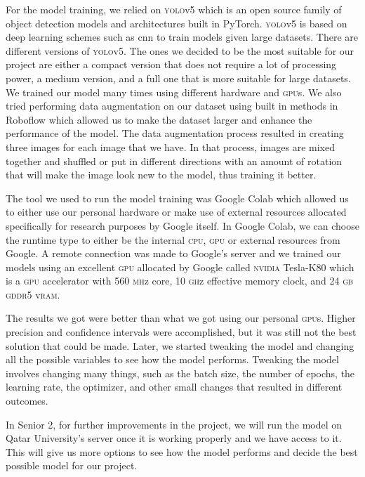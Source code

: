 \documentclass[../main.tex]{subfiles}
\begin{document}
For the model training, we relied on \textsc{yolo}v5 which is an open
source family of object detection models and architectures built in 
PyTorch. \textsc{yolo}v5 is based on deep learning schemes such as 
\gls{cnn} to train models given large datasets. There are different
versions of \textsc{yolo}v5. The ones we decided to be 
the most suitable for our project are either 
a compact version that does not require a lot of processing 
power, a medium version, and a full one that
is more suitable for large datasets. We trained our model many times 
using different hardware and \textsc{gpu}s. We also tried performing 
data augmentation on our dataset using built in methods in Roboflow 
which allowed us to make the dataset larger and enhance the performance 
of the model. The data augmentation process resulted in creating three 
images for each image that we have. In that process, images are mixed
together and shuffled or put in different directions with an amount of
rotation that will make the image look new to the model, 
thus training it better.

The tool we used to run the model training was Google 
Colab which allowed us to either use our personal hardware or 
make use of external resources allocated specifically for research 
purposes by Google itself. In Google Colab, we can choose the runtime 
type to either be the internal \textsc{cpu}, \textsc{gpu} or external 
resources from Google. A remote connection was made to Google's server 
and we trained our models using an excellent \textsc{gpu} 
allocated by Google called \textsc{nvidia} Tesla-K80 which is a \textsc{gpu} 
accelerator with 560 \textsc{mh}z core, 10 \textsc{gh}z effective memory clock, and 24 \textsc{gb} 
\textsc{gddr5} v\textsc{ram}.

The results we got were better than what we got using our personal 
\textsc{gpu}s. Higher precision and confidence intervals were 
accomplished, but it was still not the best solution that could be made. 
Later, we started tweaking the model and changing all the possible 
variables to see how the model performs. Tweaking the model involves 
changing many things, such as the batch size, the number of epochs, the 
learning rate, the optimizer, and other small changes that resulted in 
different outcomes. 

In Senior 2, for further improvements in the project, we will run the model 
on Qatar University's server once it is working properly and we have access 
to it. This will give us more options to see how the model performs and decide the 
best possible model for our project.
\end{document}
